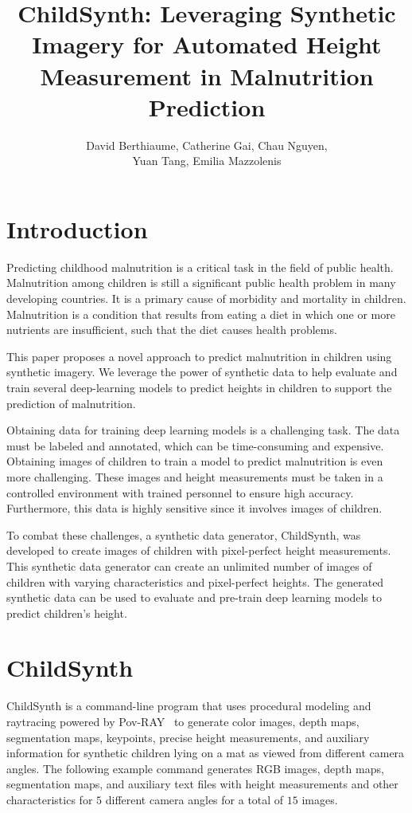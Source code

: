 \documentclass{article}
\title{ChildSynth: Leveraging Synthetic Imagery for Automated Height Measurement in Malnutrition Prediction}
\author{David Berthiaume, Catherine Gai, Chau Nguyen, \\Yuan Tang, Emilia Mazzolenis}
\begin{document}
\maketitle
\tableofcontents


\section{Introduction}

Predicting childhood malnutrition is a critical task in the field of public health. Malnutrition among children is still a significant public health problem in many developing countries. It is a primary cause of morbidity and mortality in children. Malnutrition is a condition that results from eating a diet in which one or more nutrients are insufficient, such that the diet causes health problems.

This paper proposes a novel approach to predict malnutrition in children using synthetic imagery. 
We leverage the power of synthetic data to help evaluate and train several deep-learning models to predict heights in children to support the prediction of malnutrition. 

Obtaining data for training deep learning models is a challenging task. The data must be labeled and annotated, which can be time-consuming and expensive. Obtaining images of children to train a model to predict malnutrition is even more challenging. These images and height measurements must be taken in a controlled environment with trained personnel to ensure high accuracy. Furthermore, this data is highly sensitive since it involves images of children.

To combat these challenges, a synthetic data generator, ChildSynth, was developed to create images of children with pixel-perfect height measurements. This synthetic data generator can create an unlimited number of images of children with varying characteristics and pixel-perfect heights. The generated synthetic data can be used to evaluate and pre-train deep learning models to predict children's height. 

\section{ChildSynth}

ChildSynth is a command-line program that uses procedural modeling and raytracing powered by Pov-RAY~\cite{povray} to generate color images, depth maps, segmentation maps, keypoints, precise height measurements, and auxiliary information for synthetic children lying on a mat as viewed from different camera angles. The following example command generates RGB images, depth maps, segmentation maps, and auxiliary text files with height measurements and other characteristics for $5$ different camera angles for a total of $15$ images. 
\end{document}
